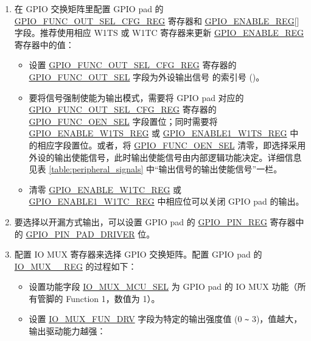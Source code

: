 \documentclass[main\_\_CN.tex]{subfiles}
\begin{document}
\begin{enumerate}
    \item 在 GPIO 交换矩阵里配置 GPIO pad  的 \hyperref[regdesc:GPIOFUNCNOUTSELCFGREG]{GPIO\_FUNC\_OUT\_SEL\_CFG\_REG} 寄存器和 \hyperref[regdesc:GPIOENABLEREG]{GPIO\_ENABLE\_REG}[] 字段。推荐使用相应 W1TS 或 W1TC 寄存器来更新 \hyperref[regdesc:GPIOENABLEREG]{GPIO\_ENABLE\_REG} 寄存器中的值：
    \begin{itemize}
        \item 设置 \hyperref[regdesc:GPIOFUNCNOUTSELCFGREG]{GPIO\_FUNC\_OUT\_SEL\_CFG\_REG} 寄存器的 \hyperref[fielddesc:GPIOFUNCNOUTSEL]{GPIO\_FUNC\_OUT\_SEL} 字段为外设输出信号  的索引号 ()。
        \item 要将信号强制使能为输出模式，需要将 GPIO pad  对应的 \hyperref[regdesc:GPIOFUNCNOUTSELCFGREG]{GPIO\_FUNC\_OUT\_SEL\_CFG\_REG} 寄存器的 \hyperref[fielddesc:GPIOFUNCNOENSEL]{GPIO\_FUNC\_OEN\_SEL} 字段置位；同时需要将 \hyperref[regdesc:GPIOENABLEW1TSREG]{GPIO\_ENABLE\_W1TS\_REG} 或 \hyperref[regdesc:GPIOENABLE1W1TSREG]{GPIO\_ENABLE1\_W1TS\_REG} 中的相应字段置位。或者，将 \hyperref[fielddesc:GPIOFUNCNOENSEL]{GPIO\_FUNC\_OEN\_SEL} 清零，即选择采用外设的输出使能信号，此时输出使能信号由内部逻辑功能决定。详细信息见表 \ref{table:peripheral_signals} 中“输出信号的输出使能信号”一栏。
        \item 清零 \hyperref[regdesc:GPIOENABLEW1TCREG]{GPIO\_ENABLE\_W1TC\_REG} 或 \hyperref[regdesc:GPIOENABLE1W1TCREG]{GPIO\_ENABLE1\_W1TC\_REG} 中相应位可以关闭 GPIO pad 的输出。
    \end{itemize}
    \item 要选择以开漏方式输出，可以设置 GPIO pad  的 \hyperref[regdesc:GPIOPINNREG]{GPIO\_PIN\_REG} 寄存器中的 \hyperref[fielddesc:GPIOPINNPADDRIVER]{GPIO\_PIN\_PAD\_DRIVER} 位。
    \item 配置 IO MUX 寄存器来选择 GPIO 交换矩阵。配置 GPIO pad  的 \hyperref[regdesc:IOMUXnREG]{IO\_MUX\_\_REG} 的过程如下：
    \begin{itemize}
        \item 设置功能字段 \hyperref[fielddesc:IOMUXMCUSEL]{IO\_MUX\_MCU\_SEL} 为 GPIO pad  的 IO MUX 功能（所有管脚的 Function 1，数值为 1）。
        \item 设置 \hyperref[fielddesc:IOMUXFUNDRV]{IO\_MUX\_FUN\_DRV} 字段为特定的输出强度值 (0 \verb+~+ 3)，值越大，输出驱动能力越强：

\end{itemize}
\end{enumerate}
\end{document}
